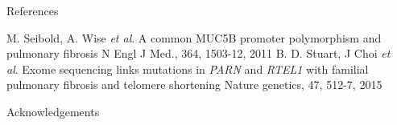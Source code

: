 \documentclass[final]{beamer}
\newlength{\sepwid}
\newlength{\onecolwid}
\begin{document}
\begin{frame}[t]
\begin{columns}[t]
\begin{column}{\onecolwid}
\begin{block}{References}
{\begin{thebibliography}{99}
         M. Seibold, A. Wise \textit{et al}.  A common MUC5B promoter polymorphism and pulmonary fibrosis N Engl J Med., 364, 1503-12, 2011
         B. D. Stuart, J Choi \textit{et al}. Exome sequencing links mutations in \textit{PARN} and \textit{RTEL1} with familial pulmonary fibrosis and telomere shortening Nature genetics, 47, 512-7, 2015
        \normalsize
        \end{thebibliography}}
        \end{block}        
        \begin{block}{Acknowledgements}
        \scriptsize 
        \end{block}        
    \end{column}
    \begin{column}{\sepwid}\end{column}
\end{columns}
\end{frame}
\end{document}
